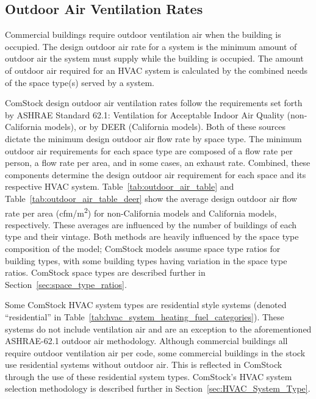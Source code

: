 \subsection{Outdoor Air Ventilation Rates}

Commercial buildings require outdoor ventilation air when the building is occupied. The design outdoor air rate for a system is the minimum amount of outdoor air the system must supply while the building is occupied. The amount of outdoor air required for an HVAC system is calculated by the combined needs of the space type(s) served by a system. 

ComStock design outdoor air ventilation rates follow the requirements set forth by ASHRAE Standard 62.1: Ventilation for Acceptable Indoor Air Quality (non-California models), or by DEER (California models). Both of these sources dictate the minimum design outdoor air flow rate by space type. The minimum outdoor air requirements for each space type are composed of a flow rate per person, a flow rate per area, and in some cases, an exhaust rate. Combined, these components determine the design outdoor air requirement for each space and its respective HVAC system. Table~\ref{tab:outdoor_air_table} and Table~\ref{tab:outdoor_air_table_deer} show the average design outdoor air flow rate per area (cfm/m\textsuperscript{2}) for non-California models and California models, respectively. These averages are influenced by the number of buildings of each type and their vintage. Both methods are heavily influenced by the space type composition of the model; ComStock models assume space type ratios for building types, with some building types having variation in the space type ratios. ComStock space types are described further in Section~\ref{sec:space_type_ratios}.

Some ComStock HVAC system types are residential style systems (denoted ``residential'' in Table~\ref{tab:hvac_system_heating_fuel_categories}). These systems do not include ventilation air and are an exception to the aforementioned ASHRAE-62.1 outdoor air methodology. Although commercial buildings all require outdoor ventilation air per code, some commercial buildings in the stock use residential systems without outdoor air. This is reflected in ComStock through the use of these residential system types. ComStock's HVAC system selection methodology is described further in Section~\ref{sec:HVAC_System_Type}.   





